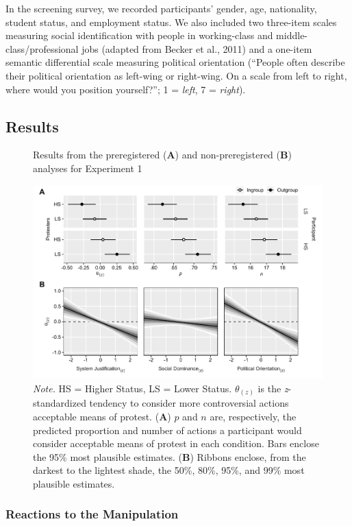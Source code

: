 \documentclass[12pt, letterpaper]{article}
\begin{document}
In the screening survey, we recorded participants' gender, age,
nationality, student status, and employment status. We also included two
three-item scales measuring social identification with people in
working-class and middle-class/professional jobs (adapted from Becker et
al., 2011) and a one-item semantic differential scale measuring
political orientation (``People often describe their political
orientation as left-wing or right-wing. On a scale from left to right,
where would you position yourself?''; 1 = \emph{left}, 7 =
\emph{right}).

\hypertarget{results}{%
\subsection{Results}\label{results}}

\begin{figure}[!t]
\centering
\caption{Results from the preregistered (\textbf{A}) and non-preregistered (\textbf{B}) analyses for Experiment 1}
\includegraphics[scale=1]{../Experiment 1/figures/figure-3}
\caption*{\textit{Note.} HS = Higher Status, LS = Lower Status. $\theta_{(z)}$ is the \textit{z}-standardized tendency to consider more controversial actions acceptable means of protest. (\textbf{A}) $p$ and $n$ are, respectively, the predicted proportion and number of actions a participant would consider acceptable means of protest in each condition. Bars enclose the 95\% most plausible estimates. (\textbf{B}) Ribbons enclose, from the darkest to the lightest shade, the 50\%, 80\%, 95\%, and 99\% most plausible estimates.}
\label{fig:f3}
\end{figure}

\hypertarget{reactions-to-the-manipulation}{%
\subsubsection{Reactions to the
Manipulation}\label{reactions-to-the-manipulation}}
\end{document}
